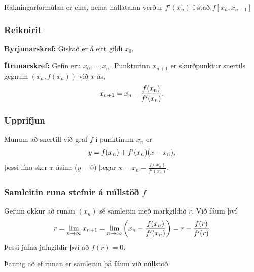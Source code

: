 \documentclass[a4paper,10pt,icelandic]{sphinxmanual}
\begin{document}
Rakningarformúlan er eins, nema hallatalan verður \(f'(x_n)\) í stað
\(f[x_n,x_{n-1}]\)


\subsubsection{Reiknirit}
\label{kafli02:id4}
\textbf{Byrjunarskref:} Giskað er á eitt gildi \(x_0\).

\textbf{Ítrunarskref:} Gefin eru \(x_0,\dots,x_n\). Punkturinn \(x_{n+1}\) er
skurðpunktur snertils gegnum \((x_n,f(x_n))\) við \(x\)-ás,
\begin{gather}
\begin{split}x_{n+1}=x_n-\dfrac{f(x_n)}{f'(x_n)}.\end{split}\notag
\end{gather}

\subsubsection{Upprifjun}
\label{kafli02:upprifjun}
Munum að snertill við graf \(f\) í punktinum \(x_n\) er
\begin{gather}
\begin{split}y=f(x_n) + f'(x_n)(x-x_n),\end{split}\notag
\end{gather}
þessi lína sker \(x\)-ásinn (\(y=0\)) þegar
\(x=x_n - \frac{f(x_n)}{f'(x_n)}\).


\subsubsection{Samleitin runa stefnir á núllstöð \(f\)}
\label{kafli02:id5}
Gefum okkur að runan \((x_n)\) sé samleitin með markgildið
\(r\). Við fáum því
\begin{gather}
\begin{split}r=\lim_{n\to \infty}x_{n+1}=\lim_{n\to \infty}
\bigg(x_n-\dfrac{f(x_n)}{f'(x_n)}\bigg) =r-\dfrac{f(r)}{f'(r)}\end{split}\notag
\end{gather}
Þessi jafna jafngildir því að \(f(r)=0\).

Þannig að ef runan er samleitin þá fáum við núllstöð.
\end{document}
